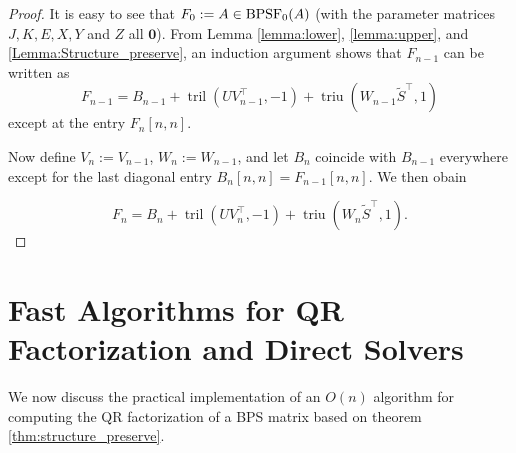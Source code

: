 \documentclass[a4paper,fleqn]{cas-sc}
\DeclareMathOperator{\triu}{triu}
\DeclareMathOperator{\tril}{tril}
\begin{document}
\begin{proof}
    It is easy to see that $F_0:=A\in {\rm BPSF}_{0}(A)$ (with the parameter matrices $J, K, E, X, Y$ and $Z$ all $\mathbf{0}$). From Lemma \ref{lemma:lower}, \ref{lemma:upper}, and \ref{Lemma:Structure_preserve}, an induction argument shows that $F_{n-1}$ can be written as 
\[
F_{n-1} = B_{n-1} + \tril(U V_{n-1}^\top,-1) + \triu(W_{n-1} \tilde S^\top,1)
\]
except at the entry $F_n[n,n]$.

Now define $V_n:=V_{n-1}$, $W_n:=W_{n-1}$, and let $B_n$ coincide with $B_{n-1}$ everywhere except for the last diagonal entry $B_n[n,n]=F_{n-1}[n,n]$. We then obain

\[
F_{n} = B_{n} + \tril(U V_{n}^\top,-1) + \triu(W_{n} \tilde S^\top,1).
\]

\end{proof}

\section{Fast Algorithms for QR Factorization and Direct Solvers}
\label{sec:algorithms}

We now discuss the practical implementation of an $O(n)$ algorithm for computing the QR factorization of a BPS matrix based on theorem \ref{thm:structure_preserve}.
\end{document}
